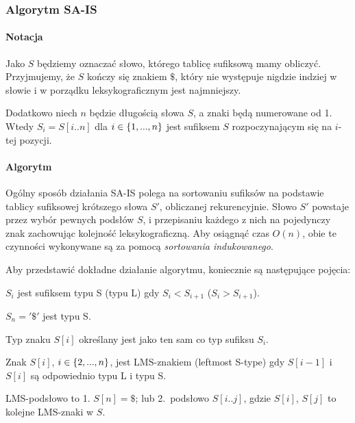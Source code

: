 \subsubsection{Algorytm SA-IS}

\paragraph{Notacja}

Jako $S$ będziemy oznaczać słowo, którego tablicę sufiksową mamy obliczyć.
Przyjmujemy, że $S$ kończy się znakiem \(\$\), który nie występuje nigdzie
indziej w słowie i w porządku leksykograficznym jest najmniejszy.

Dodatkowo niech $n$ będzie długością słowa $S$, a znaki będą numerowane od 1.
Wtedy $S_{i} = S[i..n]$ dla $i \in \range{1}{n}$ jest sufiksem $S$
rozpoczynającym się na $i$-tej pozycji.

\paragraph{Algorytm}

Ogólny sposób działania SA-IS polega na sortowaniu sufiksów na podstawie
tablicy sufiksowej krótszego słowa $S'$, obliczanej rekurencyjnie.
Słowo $S'$ powstaje przez wybór pewnych podsłów $S$, i przepisaniu każdego
z nich na pojedynczy znak zachowując kolejność leksykograficzną.
Aby osiągnąć czas $O(n)$, obie te czynności wykonywane są za pomocą
\textit{sortowania indukowanego}.

Aby przedstawić dokładne działanie algorytmu, koniecznie są następujące pojęcia:

\begin{definition}{}{}
	$S_i$ jest sufiksem typu S (typu L) gdy $S_i < S_{i+1}$ ($S_i > S_{i+1}$).

	$S_n = '\$'$ jest typu S.

	Typ znaku $S[i]$ określany jest jako ten sam co typ sufiksu $S_i$.
\end{definition}

\begin{definition}{}{}
	Znak $S[i]$, $i \in \range{2}{n}$, jest LMS-znakiem (leftmost S-type) gdy
	$S[i-1]$ i $S[i]$ są odpowiednio typu L i typu S.
\end{definition}

\begin{definition}{}{}
	LMS-podsłowo to 1. \(S[n] = \$\); lub 2.\ podsłowo $S[i..j]$, gdzie
	$S[i]$, $S[j]$ to kolejne LMS-znaki w $S$.
\end{definition}

